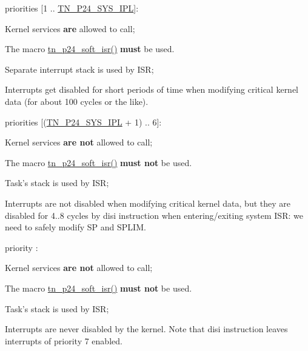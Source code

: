 \begin{DoxyItemize}
\item priorities {\ttfamily \mbox{[}1 .. \hyperlink{tn__cfg__default_8h_a4feb7eb34fc2f175167b7496b63c398a}{T\+N\+\_\+\+P24\+\_\+\+S\+Y\+S\+\_\+\+I\+P\+L}\mbox{]}}\+:
\begin{DoxyItemize}
\item Kernel services {\bfseries are} allowed to call;
\item The macro {\ttfamily \hyperlink{tn__arch__pic24_8h_a0b184d3c15066f5504144379d2624ff3}{tn\+\_\+p24\+\_\+soft\+\_\+isr()}} {\bfseries must} be used.
\item Separate interrupt stack is used by I\+S\+R;
\item Interrupts get disabled for short periods of time when modifying critical kernel data (for about 100 cycles or the like).
\end{DoxyItemize}
\item priorities {\ttfamily \mbox{[}(\hyperlink{tn__cfg__default_8h_a4feb7eb34fc2f175167b7496b63c398a}{T\+N\+\_\+\+P24\+\_\+\+S\+Y\+S\+\_\+\+I\+P\+L} + 1) .. 6\mbox{]}}\+:
\begin{DoxyItemize}
\item Kernel services {\bfseries are not} allowed to call;
\item The macro {\ttfamily \hyperlink{tn__arch__pic24_8h_a0b184d3c15066f5504144379d2624ff3}{tn\+\_\+p24\+\_\+soft\+\_\+isr()}} {\bfseries must not} be used.
\item Task's stack is used by I\+S\+R;
\item Interrupts are not disabled when modifying critical kernel data, but they are disabled for 4..8 cycles by {\ttfamily disi} instruction when entering/exiting system I\+S\+R\+: we need to safely modify {\ttfamily S\+P} and {\ttfamily S\+P\+L\+I\+M}.
\end{DoxyItemize}
\item priority {}\+:
\begin{DoxyItemize}
\item Kernel services {\bfseries are not} allowed to call;
\item The macro {\ttfamily \hyperlink{tn__arch__pic24_8h_a0b184d3c15066f5504144379d2624ff3}{tn\+\_\+p24\+\_\+soft\+\_\+isr()}} {\bfseries must not} be used.
\item Task's stack is used by I\+S\+R;
\item Interrupts are never disabled by the kernel. Note that {\ttfamily disi} instruction leaves interrupts of priority 7 enabled.
\end{DoxyItemize}
\end{DoxyItemize}

